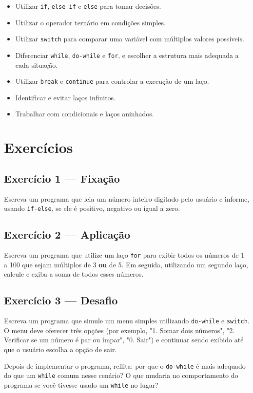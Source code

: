 \documentclass[12pt,a4paper,oneside]{extreport}
\begin{document}
\begin{objetivos}
\begin{itemize}
    \item Utilizar \texttt{if}, \texttt{else if} e \texttt{else} para tomar decisões.
    \item Utilizar o operador ternário em condições simples.
    \item Utilizar \texttt{switch} para comparar uma variável com múltiplos valores possíveis.
    \item Diferenciar \texttt{while}, \texttt{do-while} e \texttt{for}, e escolher a estrutura mais adequada a cada situação.
    \item Utilizar \texttt{break} e \texttt{continue} para controlar a execução de um laço.
    \item Identificar e evitar laços infinitos.
    \item Trabalhar com condicionais e laços aninhados.
\end{itemize}
\end{objetivos}

\section*{Exercícios}

\begin{exercicio}

\subsection*{Exercício 1 --- Fixação}
Escreva um programa que leia um número inteiro digitado pelo usuário e informe, usando \texttt{if-else}, se ele é positivo, negativo ou igual a zero.

\subsection*{Exercício 2 --- Aplicação}
Escreva um programa que utilize um laço \texttt{for} para exibir todos os números de 1 a 100 que sejam múltiplos de 3 \textbf{ou} de 5. Em seguida, utilizando um segundo laço, calcule e exiba a soma de todos esses números.

\subsection*{Exercício 3 --- Desafio}
Escreva um programa que simule um menu simples utilizando \texttt{do-while} e \texttt{switch}. O menu deve oferecer três opções (por exemplo, "1. Somar dois números", "2. Verificar se um número é par ou ímpar", "0. Sair") e continuar sendo exibido até que o usuário escolha a opção de sair.

Depois de implementar o programa, reflita: por que o \texttt{do-while} é mais adequado do que um \texttt{while} comum nesse cenário? O que mudaria no comportamento do programa se você tivesse usado um \texttt{while} no lugar?

\end{exercicio}
\end{document}
